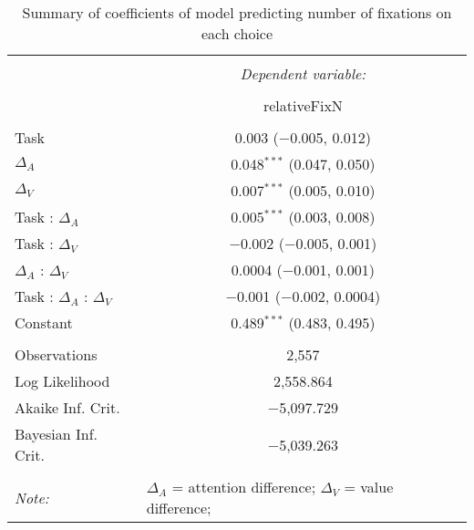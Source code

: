 
\begin{table}[!b] \centering 
  \caption{Summary of coefficients of model predicting number of fixations on each choice} 
  \label{table:nFixModel} 
\begin{tabular}{@{\extracolsep{5pt}}lc} 
\\[-1.8ex]\hline 
\hline \\[-1.8ex] 
 & \multicolumn{1}{c}{\textit{Dependent variable:}} \\ 
\cline{2-2} 
\\[-1.8ex] & relativeFixN \\ 
\hline \\[-1.8ex] 
 Task & 0.003 ($-$0.005, 0.012) \\ 
  $\Delta_A$ & 0.048$^{***}$ (0.047, 0.050) \\ 
  $\Delta_V$ & 0.007$^{***}$ (0.005, 0.010) \\ 
  Task : $\Delta_A$ & 0.005$^{***}$ (0.003, 0.008) \\ 
  Task : $\Delta_V$ & $-$0.002 ($-$0.005, 0.001) \\ 
  $\Delta_A$ : $\Delta_V$ & 0.0004 ($-$0.001, 0.001) \\ 
  Task : $\Delta_A$ :  $\Delta_V$ & $-$0.001 ($-$0.002, 0.0004) \\ 
  Constant & 0.489$^{***}$ (0.483, 0.495) \\ 
 \hline \\[-1.8ex] 
Observations & 2,557 \\ 
Log Likelihood & 2,558.864 \\ 
Akaike Inf. Crit. & $-$5,097.729 \\ 
Bayesian Inf. Crit. & $-$5,039.263 \\ 
\hline 
\hline \\[-1.8ex] 
\textit{Note:}  & \multicolumn{1}{l}{\footnotesize $\Delta_A$ = attention difference; $\Delta_V$ = value difference; } \\ 
\end{tabular} 
\end{table} 
